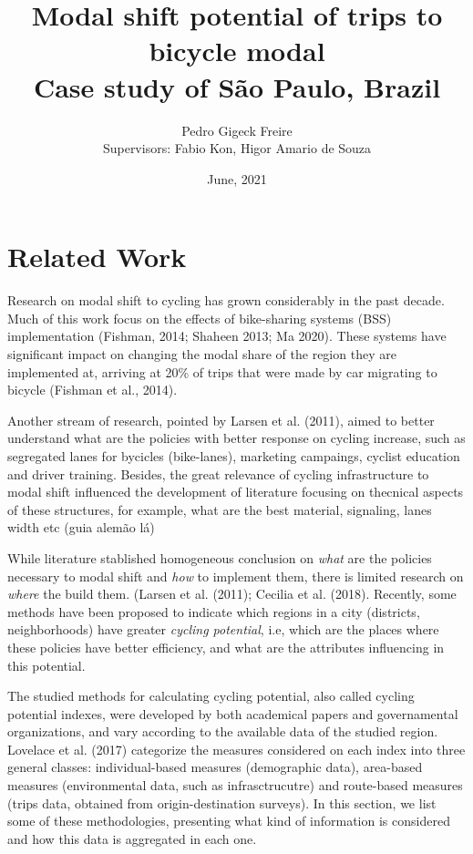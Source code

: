 \documentclass[a4paper]{article}
\title{Modal shift potential of trips to bicycle modal
\\ \large Case study of São Paulo, Brazil}
\author{Pedro Gigeck Freire \\
Supervisors: Fabio Kon, Higor Amario de Souza}
\date{June, 2021}
\begin{document}
\maketitle

\section*{Related Work}

Research on modal shift to cycling has grown considerably in the past decade. Much of this work focus on the effects of bike-sharing systems (BSS) implementation (Fishman, 2014; Shaheen 2013; Ma 2020). These systems have significant impact on changing the modal share of the region they are implemented at, arriving at 20\% of trips that were made by car migrating to bicycle (Fishman et al., 2014).

Another stream of research, pointed by Larsen et al. (2011), aimed to better understand what are the policies with better response on cycling increase, such as segregated lanes for bycicles (bike-lanes), marketing campaings, cyclist education and driver training. Besides, the great relevance of cycling infrastructure to modal shift influenced the development of literature focusing on thecnical aspects of these structures, for example, what are the best material, signaling, lanes width etc (guia alemão lá)

While literature stablished homogeneous conclusion on \textit{what} are the policies necessary to modal shift and \textit{how} to implement them, there is limited research on \textit{where} the build them. (Larsen et al. (2011); Cecilia et al. (2018). Recently, some methods have been proposed to indicate which regions in a city (districts, neighborhoods) have greater \textit{cycling potential}, i.e, which are the places where these policies have better efficiency, and what are the attributes influencing in this potential.

The studied methods for calculating cycling potential, also called cycling potential indexes, were developed by both academical papers and governamental organizations, and vary according to the available data of the studied region. Lovelace et al. (2017) categorize the measures considered on each index into three general classes: 
individual-based measures (demographic data), area-based measures (environmental data, such as infrasctrucutre) and route-based measures (trips data, obtained from origin-destination surveys). In this section, we list some of these methodologies, presenting what kind of information is considered and how this data is aggregated in each one.
\end{document}

